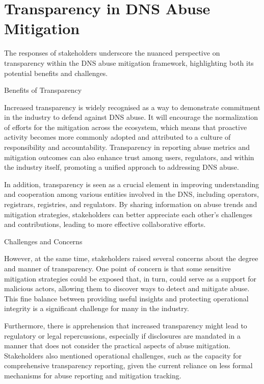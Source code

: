 \section{Transparency in DNS Abuse Mitigation} 

The responses of stakeholders underscore the nuanced perspective on transparency within the DNS abuse mitigation framework, highlighting both its potential benefits and challenges.

Benefits of Transparency

Increased transparency is widely recognised as a way to demonstrate commitment in the industry to defend against DNS abuse. It will encourage the normalization of efforts for the mitigation across the ecosystem, which means that proactive activity becomes more commonly adopted and attributed to a culture of responsibility and accountability. Transparency in reporting abuse metrics and mitigation outcomes can also enhance trust among users, regulators, and within the industry itself, promoting a unified approach to addressing DNS abuse.

In addition, transparency is seen as a crucial element in improving understanding and cooperation among various entities involved in the DNS, including operators, registrars, registries, and regulators. By sharing information on abuse trends and mitigation strategies, stakeholders can better appreciate each other's challenges and contributions, leading to more effective collaborative efforts.


Challenges and Concerns

However, at the same time, stakeholders raised several concerns about the degree and manner of transparency. One point of concern is that some sensitive mitigation strategies could be exposed that, in turn, could serve as a support for malicious actors, allowing them to discover ways to detect and mitigate abuse. This fine balance between providing useful insights and protecting operational integrity is a significant challenge for many in the industry.

Furthermore, there is apprehension that increased transparency might lead to regulatory or legal repercussions, especially if disclosures are mandated in a manner that does not consider the practical aspects of abuse mitigation. Stakeholders also mentioned operational challenges, such as the capacity for comprehensive transparency reporting, given the current reliance on less formal mechanisms for abuse reporting and mitigation tracking.



